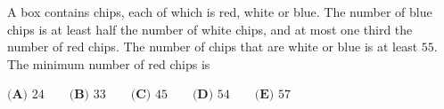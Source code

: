 A box contains chips, each of which is red, white or blue. The number of blue chips is at least half the number of white chips, and at most one third the number of red chips. The number of chips that are white or blue is at least $55$. The minimum number of red chips is

$\textbf{(A) }24\qquad\textbf{(B) }33\qquad\textbf{(C) }45\qquad\textbf{(D) }54\qquad\textbf{(E) }57$
